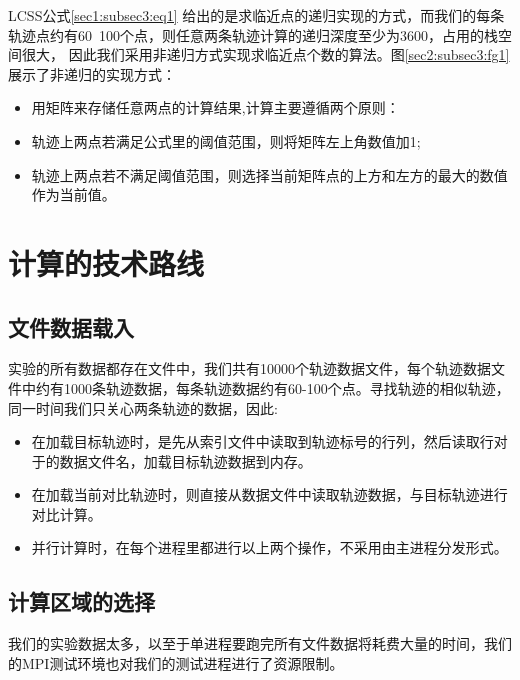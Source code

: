 \documentclass[UTF8]{ctexart}
\begin{document}
LCSS公式\ref{sec1:subsec3:eq1} 给出的是求临近点的递归实现的方式，而我们的每条轨迹点约有60~100个点，则任意两条轨迹计算的递归深度至少为3600，占用的栈空间很大，
因此我们采用非递归方式实现求临近点个数的算法。图\ref{sec2:subsec3:fg1}展示了非递归的实现方式：

\begin{itemize}
	\item 用矩阵来存储任意两点的计算结果,计算主要遵循两个原则：
	\item 轨迹上两点若满足公式里的阈值范围，则将矩阵左上角数值加1;
	\item 轨迹上两点若不满足阈值范围，则选择当前矩阵点的上方和左方的最大的数值作为当前值。
\end{itemize}

\section{计算的技术路线}\label{sec3}
\subsection{文件数据载入}
实验的所有数据都存在文件中，我们共有10000个轨迹数据文件，每个轨迹数据文件中约有1000条轨迹数据，每条轨迹数据约有60-100个点。寻找轨迹的相似轨迹，同一时间我们只关心两条轨迹的数据，因此:

\begin{itemize}
	\item 在加载目标轨迹时，是先从索引文件中读取到轨迹标号的行列，然后读取行对于的数据文件名，加载目标轨迹数据到内存。
	\item 在加载当前对比轨迹时，则直接从数据文件中读取轨迹数据，与目标轨迹进行对比计算。
	\item 并行计算时，在每个进程里都进行以上两个操作，不采用由主进程分发形式。
\end{itemize}

\subsection{计算区域的选择}
\label{sec3:subsec2}
我们的实验数据太多，以至于单进程要跑完所有文件数据将耗费大量的时间，我们的MPI测试环境也对我们的测试进程进行了资源限制。
\end{document}
